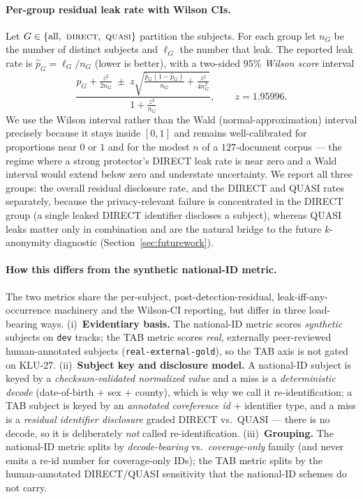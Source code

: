 \documentclass[11pt]{article}
\begin{document}
\paragraph{Per-group residual leak rate with Wilson CIs.}
Let $G \in \{\text{all},\ \textsc{direct},\ \textsc{quasi}\}$ partition the subjects.
For each group let $n_G$ be the number of distinct subjects and $\ell_G$ the number that
leak. The reported leak rate is $\hat{p}_G = \ell_G / n_G$ (lower is better), with a
two-sided $95\%$ \emph{Wilson score} interval
\[
  \frac{\hat{p}_G + \tfrac{z^2}{2 n_G} \;\pm\;
  z\sqrt{\tfrac{\hat{p}_G(1-\hat{p}_G)}{n_G} + \tfrac{z^2}{4 n_G^2}}}
  {1 + \tfrac{z^2}{n_G}},
  \qquad z = 1.95996.
\]
We use the Wilson interval rather than the Wald (normal-approximation) interval precisely
because it stays inside $[0,1]$ and remains well-calibrated for proportions near $0$ or
$1$ and for the modest $n$ of a $127$-document corpus --- the regime where a strong
protector's DIRECT leak rate is near zero and a Wald interval would extend below zero and
understate uncertainty. We report all three groups: the overall residual disclosure rate,
and the DIRECT and QUASI rates separately, because the privacy-relevant failure is
concentrated in the DIRECT group (a single leaked DIRECT identifier discloses a subject),
whereas QUASI leaks matter only in combination and are the natural bridge to the future
$k$-anonymity diagnostic (Section~\ref{sec:futurework}).

\paragraph{How this differs from the synthetic national-ID metric.}
The two metrics share the per-subject, post-detection-residual, leak-iff-any-occurrence
machinery and the Wilson-CI reporting, but differ in three load-bearing ways.
(i)~\textbf{Evidentiary basis.} The national-ID metric scores \emph{synthetic} subjects on
\texttt{dev} tracks; the TAB metric scores \emph{real}, externally peer-reviewed
human-annotated subjects (\texttt{real-external-gold}), so the TAB axis is not gated on
KLU-27. (ii)~\textbf{Subject key and disclosure model.} A national-ID subject is keyed by a
\emph{checksum-validated normalized value} and a miss is a \emph{deterministic decode}
(date-of-birth $+$ sex $+$ county), which is why we call it re-identification; a TAB
subject is keyed by an \emph{annotated coreference id} $+$ identifier type, and a miss is a
\emph{residual identifier disclosure} graded DIRECT vs.\ QUASI --- there is no decode, so it
is deliberately \emph{not} called re-identification. (iii)~\textbf{Grouping.} The
national-ID metric splits by \emph{decode-bearing} vs.\ \emph{coverage-only} family (and
never emits a re-id number for coverage-only IDs); the TAB metric splits by the
human-annotated DIRECT/QUASI sensitivity that the national-ID schemes do not carry.
\end{document}
